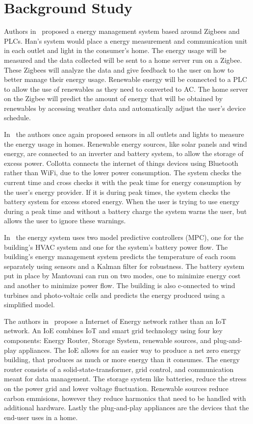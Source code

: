 \documentclass[letterpaper,12pt]{article}   %
\begin{document}
\section{Background Study} %

Authors in~\cite{Han2014} proposed a energy management system based around Zigbees and PLCs. Han's system would place a energy measurement and communication unit in each outlet and light in the consumer's home. The energy usage will be measured and the data collected will be sent to a home server run on a Zigbee. These Zigbees will analyze the data and give feedback to the user on how to better manage their energy usage. Renewable energy will be connected to a PLC to allow the use of renewables as they need to converted to AC. The home server on the Zigbee will predict the amount of energy that will be obtained by renewables by accessing weather data and automatically adjust the user's device schedule.

In~\cite{Collotta2015} the authors once again proposed sensors in all outlets and lights to measure the energy usage in homes. Renewable energy sources, like solar panels and wind energy, are connected to an inverter and battery system, to allow the storage of excess power. Collotta connects the internet of things devices using Bluetooth rather than WiFi, due to the lower power consumption. The system checks the current time and cross checks it with the peak time for energy consumption by the user's energy provider. If it is during peak times, the system checks the battery system for excess stored energy. When the user is trying to use energy during a peak time and without a battery charge the system warns the user, but allows the user to ignore these warnings.

In~\cite{Mantovani2014} the energy system uses two model predictive controllers (MPC), one for the building's HVAC system and one for the system's battery power flow. The building's energy management system predicts the temperature of each room separately using sensors and a Kalman filter for robustness. The battery system put in place by Mantovani can run on two modes, one to minimize energy cost and another to minimize power flow. The building is also c-onnected to wind turbines and photo-voltaic cells and predicts the energy produced using a simplified model.

The authors in~\cite{Hannan2018} propose a Internet of Energy network rather than an IoT network. An IoE combines IoT and smart grid technology using four key components: Energy Router, Storage System, renewable sources, and plug-and-play appliances. The IoE allows for an easier way to produce a net zero energy building, that produces as much or more energy than it consumes. The energy router consists of a solid-state-transformer, grid control, and communication meant for data management. The storage system like batteries, reduce the stress on the power grid and lower voltage fluctuation. Renewable sources reduce carbon emmisions, however they reduce harmonics that need to be handled with additional hardware. Lastly the plug-and-play appliances are the devices that the end-user uses in a home.
\end{document}

